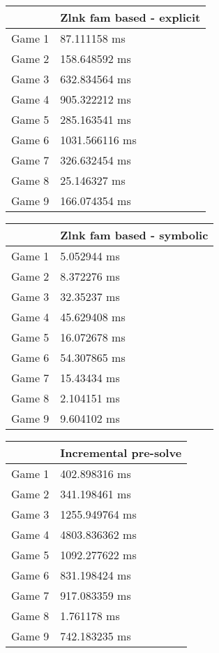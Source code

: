 \begin{tabular}{|l|l|}
	\hline
	& Zlnk fam based - explicit \\ \hline
	Game 1 & 87.111158 ms \\ \hline
	Game 2 & 158.648592 ms \\ \hline
	Game 3 & 632.834564 ms \\ \hline
	Game 4 & 905.322212 ms \\ \hline
	Game 5 & 285.163541 ms \\ \hline
	Game 6 & 1031.566116 ms \\ \hline
	Game 7 & 326.632454 ms \\ \hline
	Game 8 & 25.146327 ms \\ \hline
	Game 9 & 166.074354 ms \\ \hline
\end{tabular}
\begin{tabular}{|l|l|}
	\hline
	& Zlnk fam based - symbolic \\ \hline
	Game 1 & 5.052944 ms \\ \hline
	Game 2 & 8.372276 ms \\ \hline
	Game 3 & 32.35237 ms \\ \hline
	Game 4 & 45.629408 ms \\ \hline
	Game 5 & 16.072678 ms \\ \hline
	Game 6 & 54.307865 ms \\ \hline
	Game 7 & 15.43434 ms \\ \hline
	Game 8 & 2.104151 ms \\ \hline
	Game 9 & 9.604102 ms \\ \hline
\end{tabular}
\begin{tabular}{|l|l|}
	\hline
	& Incremental pre-solve \\ \hline
	Game 1 & 402.898316 ms \\ \hline
	Game 2 & 341.198461 ms \\ \hline
	Game 3 & 1255.949764 ms \\ \hline
	Game 4 & 4803.836362 ms \\ \hline
	Game 5 & 1092.277622 ms \\ \hline
	Game 6 & 831.198424 ms \\ \hline
	Game 7 & 917.083359 ms \\ \hline
	Game 8 & 1.761178 ms \\ \hline
	Game 9 & 742.183235 ms \\ \hline
\end{tabular}

